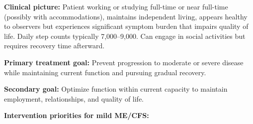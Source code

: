 \begin{keypoint}
\textbf{Clinical picture:} Patient working or studying full-time or near full-time (possibly with accommodations), maintains independent living, appears healthy to observers but experiences significant symptom burden that impairs quality of life. Daily step counts typically 7,000--9,000. Can engage in social activities but requires recovery time afterward.

\textbf{Primary treatment goal:} Prevent progression to moderate or severe disease while maintaining current function and pursuing gradual recovery.

\textbf{Secondary goal:} Optimize function within current capacity to maintain employment, relationships, and quality of life.
\end{keypoint}

\textbf{Intervention priorities for mild ME/CFS:}

